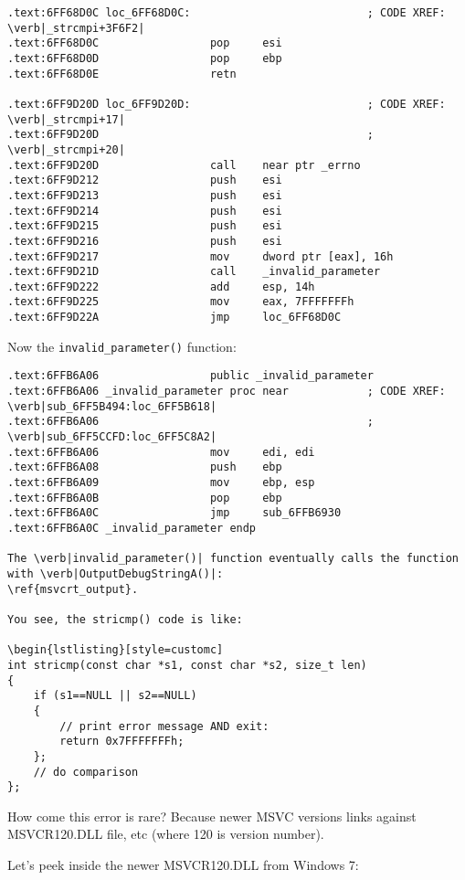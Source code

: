\begin{lstlisting}[style=customasmx86]
.text:6FF68D0C loc_6FF68D0C:                           ; CODE XREF: \verb|_strcmpi+3F6F2|
.text:6FF68D0C                 pop     esi
.text:6FF68D0D                 pop     ebp
.text:6FF68D0E                 retn

.text:6FF9D20D loc_6FF9D20D:                           ; CODE XREF: \verb|_strcmpi+17|
.text:6FF9D20D                                         ; \verb|_strcmpi+20|
.text:6FF9D20D                 call    near ptr _errno
.text:6FF9D212                 push    esi
.text:6FF9D213                 push    esi
.text:6FF9D214                 push    esi
.text:6FF9D215                 push    esi
.text:6FF9D216                 push    esi
.text:6FF9D217                 mov     dword ptr [eax], 16h
.text:6FF9D21D                 call    _invalid_parameter
.text:6FF9D222                 add     esp, 14h
.text:6FF9D225                 mov     eax, 7FFFFFFFh
.text:6FF9D22A                 jmp     loc_6FF68D0C
\end{lstlisting}

Now the \verb|invalid_parameter()| function:

\begin{lstlisting}[style=customasmx86]
.text:6FFB6A06                 public _invalid_parameter
.text:6FFB6A06 _invalid_parameter proc near            ; CODE XREF: \verb|sub_6FF5B494:loc_6FF5B618|
.text:6FFB6A06                                         ; \verb|sub_6FF5CCFD:loc_6FF5C8A2|
.text:6FFB6A06                 mov     edi, edi
.text:6FFB6A08                 push    ebp
.text:6FFB6A09                 mov     ebp, esp
.text:6FFB6A0B                 pop     ebp
.text:6FFB6A0C                 jmp     sub_6FFB6930
.text:6FFB6A0C _invalid_parameter endp

The \verb|invalid_parameter()| function eventually calls the function with \verb|OutputDebugStringA()|:
\ref{msvcrt_output}.

You see, the stricmp() code is like:

\begin{lstlisting}[style=customc]
int stricmp(const char *s1, const char *s2, size_t len)
{
	if (s1==NULL || s2==NULL)
	{
		// print error message AND exit:
		return 0x7FFFFFFFh;
	};
	// do comparison
};
\end{lstlisting}

How come this error is rare? Because newer MSVC versions links against MSVCR120.DLL file, etc (where 120 is version number).

Let's peek inside the newer MSVCR120.DLL from Windows 7:

